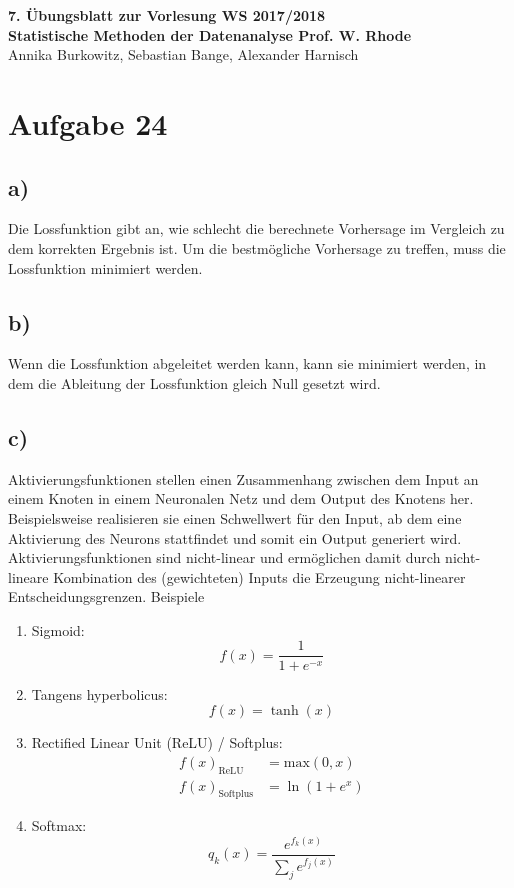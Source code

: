 \documentclass[a4paper, 11pt]{article}
\begin{document}
\noindent
\large{\textbf{7. Übungsblatt zur Vorlesung \hfill WS 2017/2018 \\
Statistische Methoden der Datenanalyse \hfill Prof. W. Rhode}} \\
Annika Burkowitz, Sebastian Bange, Alexander Harnisch \\
\noindent\makebox[\linewidth]{\rule{\textwidth}{0.4pt}}

\section*{Aufgabe 24}
\subsection*{a)}
Die Lossfunktion gibt an, wie schlecht die berechnete Vorhersage im Vergleich
zu dem korrekten Ergebnis ist.
Um die bestmögliche Vorhersage zu treffen, muss die Lossfunktion minimiert werden.

\subsection*{b)}
Wenn die Lossfunktion abgeleitet werden kann, kann sie minimiert werden, in dem
die Ableitung der Lossfunktion gleich Null gesetzt wird.

\subsection*{c)}
Aktivierungsfunktionen stellen einen Zusammenhang zwischen dem Input an einem
Knoten in einem Neuronalen Netz und dem Output des Knotens her. Beispielsweise
realisieren sie einen Schwellwert für den Input, ab dem eine Aktivierung des
Neurons stattfindet und somit ein Output generiert wird.
Aktivierungsfunktionen sind nicht-linear und ermöglichen damit durch nicht-lineare
Kombination des (gewichteten) Inputs die Erzeugung nicht-linearer Entscheidungsgrenzen.
\newline
Beispiele
\begin{enumerate}
  \item Sigmoid:
   \begin{equation*}
     f(x)=\frac{1}{1+e^{-x}}
   \end{equation*}
  \item Tangens hyperbolicus:
   \begin{equation*}
     f(x)=\tanh(x)
   \end{equation*}
  \item Rectified Linear Unit (ReLU) / Softplus:
   \begin{align*}
     f(x)_\text{ReLU}&=\text{max}(0,x)\\
     f(x)_\text{Softplus}&=\ln\left(1+e^{x}\right)
   \end{align*}
  \item Softmax:
   \begin{equation*}
     q_k(x)=\frac{e^{f_k(x)}}{\sum_j e^{f_j(x)}}
   \end{equation*}
\end{enumerate}
\end{document}
